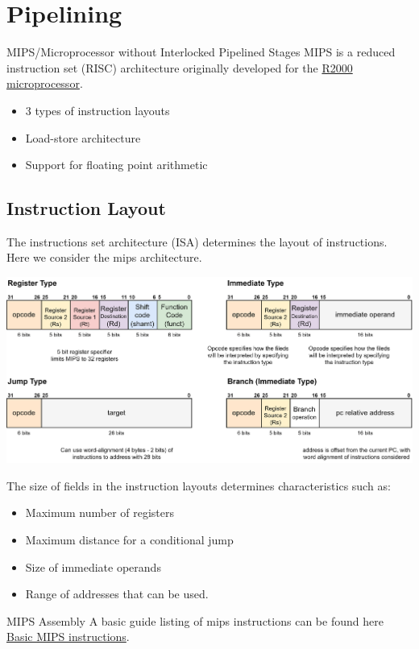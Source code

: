 \chapter{Pipelining}
\begin{definitionbox}{MIPS/Microprocessor without Interlocked Pipelined Stages}
	MIPS is a reduced instruction set (RISC) architecture originally developed for the \href{https://en.wikipedia.org/wiki/R2000_microprocessor}{R2000 microprocessor}.
	\begin{itemize}
		\item 3 types of instruction layouts
		\item Load-store architecture
		\item Support for floating point arithmetic
	\end{itemize}
\end{definitionbox}

\section{Instruction Layout}
The instructions set architecture (ISA) determines the layout of instructions. Here we consider the mips architecture.
\begin{center}
	\includegraphics[width=.9\textwidth]{pipelining/images/MIPS_instruction_set.drawio.png}
\end{center}
The size of fields in the instruction layouts determines characteristics such as:
\begin{itemize}
	\item Maximum number of registers
	\item Maximum distance for a conditional jump
	\item Size of immediate operands
	\item Range of addresses that can be used.
\end{itemize}
\begin{sidenotebox}{MIPS Assembly}
	A basic guide listing of mips instructions can be found here \href{https://www.dsi.unive.it/~gasparetto/materials/MIPS_Instruction_Set.pdf}{Basic MIPS instructions}.
\end{sidenotebox}

